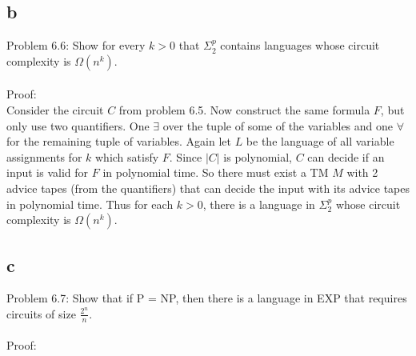 \documentclass[letterpaper,notitlepage,twoside]{article}
\begin{document}
\subsection*{b}
Problem 6.6: Show for every $k > 0$ that $\Sigma_2^p$ contains languages whose circuit complexity is $\Omega\left(n^k\right)$.
\\\\
Proof:
\\
Consider the circuit $C$ from problem 6.5. Now construct the same formula $F$, but only use two quantifiers. One $\exists$ over the tuple of some of the variables and one $\forall$ for the remaining tuple of variables. Again let $L$ be the language of all variable assignments for $k$ which satisfy $F$. Since $\left| C \right|$ is polynomial, $C$ can decide if an input is valid for $F$ in polynomial time. So there must exist a TM $M$ with 2 advice tapes (from the quantifiers) that can decide the input with its advice tapes in polynomial time. Thus for each $k > 0$, there is a language in $\Sigma_2^p$ whose circuit complexity is $\Omega\left(n^k\right)$.

\subsection*{c}
Problem 6.7: Show that if P = NP, then there is a language in EXP that requires circuits of size $\frac{2^n}{n}$.
\\\\
Proof:
\\
\end{document}

